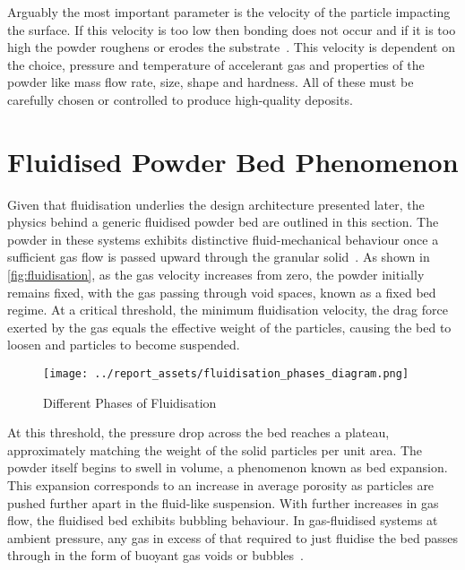 Arguably the most important parameter is the velocity of the particle impacting the surface. If this velocity is too low then bonding does not occur and if it is too high the powder roughens or erodes the substrate~\cite{Guo2022}. This velocity is dependent on the choice, pressure and temperature of accelerant gas and properties of the powder like mass flow rate, size, shape and hardness. All of these must be carefully chosen or controlled to produce high-quality deposits.


\section{Fluidised Powder Bed Phenomenon}\label{sec:background-powder-beds}
Given that fluidisation underlies the design architecture presented later, the physics behind a generic fluidised powder bed are outlined in this section. The powder in these systems exhibits distinctive fluid-mechanical behaviour once a sufficient gas flow is passed upward through the granular solid~\cite{KuniiLevenspiel1977}. As shown in \autoref{fig:fluidisation}, as the gas velocity increases from zero, the powder initially remains fixed, with the gas passing through void spaces, known as a fixed bed regime. At a critical threshold, the minimum fluidisation velocity, the drag force exerted by the gas equals the effective weight of the particles, causing the bed to loosen and particles to become suspended.
\begin{figure}[htbp]
    \centering
    
    \begin{minipage}{0.45\textwidth}
        \centering
        \texttt{[image: ../report\_assets/fluidisation\_phases\_diagram.png]}
        \caption{Different Phases of Fluidisation~\cite{klaren2021fluidization}}
    \end{minipage}
    
\end{figure}\label{fig:fluidisation}
At this threshold, the pressure drop across the bed reaches a plateau, approximately matching the weight of the solid particles per unit area. The powder itself begins to swell in volume, a phenomenon known as bed expansion. This expansion corresponds to an increase in average porosity as particles are pushed further apart in the fluid-like suspension. With further increases in gas flow, the fluidised bed exhibits bubbling behaviour. In gas-fluidised systems at ambient pressure, any gas in excess of that required to just fluidise the bed passes through in the form of buoyant gas voids or bubbles~\cite{SHENG2022137168}.

